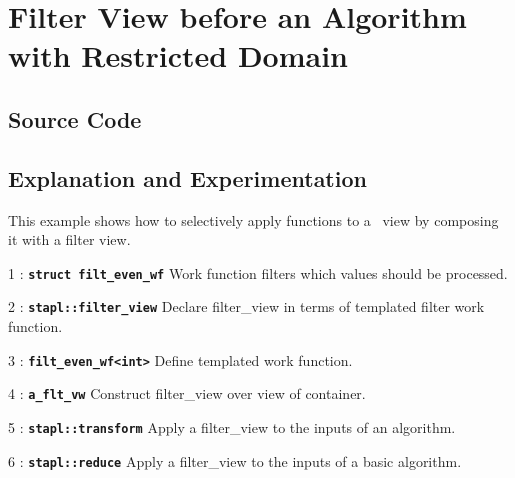 \documentclass{report}
\begin{document}

\pagebreak
\section{Filter View before an Algorithm with Restricted Domain}

\subsection{Source Code}



\subsection{Explanation and Experimentation}

This example shows how to selectively apply functions to a
\stapl\ view by composing it with a filter view.

\begin{hashitemize}
\item 1 : \texttt{{\bf struct filt\_even\_wf}}
\newline
Work function filters which values should be processed.

\item 2 : \texttt{{\bf stapl::filter\_view}}
\newline
Declare filter\_view in terms of templated filter work function.

\item 3 : \texttt{{\bf filt\_even\_wf<int>}}
\newline
Define templated work function.

\item 4 : \texttt{{\bf a\_flt\_vw}}
\newline
Construct filter\_view over view of container.

\item 5 : \texttt{{\bf stapl::transform}}
\newline
Apply a filter\_view to the inputs of an algorithm.

\item 6 : \texttt{{\bf stapl::reduce}}
\newline
Apply a filter\_view to the inputs of a basic algorithm.

\end{hashitemize}

\end{document}
